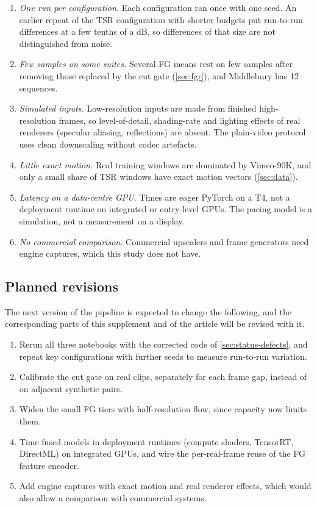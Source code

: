 \begin{enumerate}
\item \emph{One run per configuration.} Each configuration ran once with one seed. An earlier repeat of the TSR configuration with shorter budgets put run-to-run differences at a few tenths of a dB, so differences of that size are not distinguished from noise.
\item \emph{Few samples on some suites.} Several FG means rest on few samples after removing those replaced by the cut gate (\cref{sec:fgr}), and Middlebury has 12 sequences.
\item \emph{Simulated inputs.} Low-resolution inputs are made from finished high-resolution frames, so level-of-detail, shading-rate and lighting effects of real renderers (specular aliasing, reflections) are absent. The plain-video protocol uses clean downscaling without codec artefacts.
\item \emph{Little exact motion.} Real training windows are dominated by Vimeo-90K, and only a small share of TSR windows have exact motion vectors (\cref{sec:data}).
\item \emph{Latency on a data-centre GPU.} Times are eager PyTorch on a T4, not a deployment runtime on integrated or entry-level GPUs. The pacing model is a simulation, not a measurement on a display.
\item \emph{No commercial comparison.} Commercial upscalers and frame generators need engine captures, which this study does not have.
\end{enumerate}

\subsection{Planned revisions}\label{sec:status-revisions}

The next version of the pipeline is expected to change the following, and the corresponding parts of this supplement and of the article will be revised with it.

\begin{enumerate}
\item Rerun all three notebooks with the corrected code of \cref{sec:status-defects}, and repeat key configurations with further seeds to measure run-to-run variation.
\item Calibrate the cut gate on real clips, separately for each frame gap, instead of on adjacent synthetic pairs.
\item Widen the small FG tiers with half-resolution flow, since capacity now limits them.
\item Time fused models in deployment runtimes (compute shaders, TensorRT, DirectML) on integrated GPUs, and wire the per-real-frame reuse of the FG feature encoder.
\item Add engine captures with exact motion and real renderer effects, which would also allow a comparison with commercial systems.
\end{enumerate}
